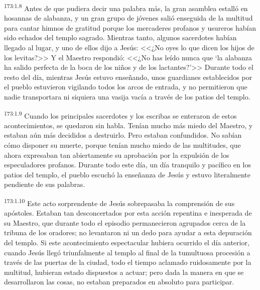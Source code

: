 \par 
\textsuperscript{173:1.8} Antes de que pudiera decir una palabra más, la gran asamblea estalló en hosannas de alabanza, y un gran grupo de jóvenes salió enseguida de la multitud para cantar himnos de gratitud porque los mercaderes profanos y usureros habían sido echados del templo sagrado. Mientras tanto, algunos sacerdotes habían llegado al lugar, y uno de ellos dijo a Jesús: <<¿No oyes lo que dicen los hijos de los levitas?>> Y el Maestro respondió: <<¿No has leído nunca que `la alabanza ha salido perfecta de la boca de los niños y de los lactantes?'>> Durante todo el resto del día, mientras Jesús estuvo enseñando, unos guardianes establecidos por el pueblo estuvieron vigilando todos los arcos de entrada, y no permitieron que nadie transportara ni siquiera una vasija vacía a través de los patios del templo.

\par 
\textsuperscript{173:1.9} Cuando los principales sacerdotes y los escribas se enteraron de estos acontecimientos, se quedaron sin habla. Tenían mucho más miedo del Maestro, y estaban aún más decididos a destruirlo. Pero estaban confundidos. No sabían cómo disponer su muerte, porque tenían mucho miedo de las multitudes, que ahora expresaban tan abiertamente su aprobación por la expulsión de los especuladores profanos. Durante todo este día, un día tranquilo y pacífico en los patios del templo, el pueblo escuchó la enseñanza de Jesús y estuvo literalmente pendiente de sus palabras.

\par 
\textsuperscript{173:1.10} Este acto sorprendente de Jesús sobrepasaba la comprensión de sus apóstoles. Estaban tan desconcertados por esta acción repentina e inesperada de su Maestro, que durante todo el episodio permanecieron agrupados cerca de la tribuna de los oradores; no levantaron ni un dedo para ayudar a esta depuración del templo. Si este acontecimiento espectacular hubiera ocurrido el día anterior, cuando Jesús llegó triunfalmente al templo al final de la tumultuosa procesión a través de las puertas de la ciudad, todo el tiempo aclamado ruidosamente por la multitud, hubieran estado dispuestos a actuar; pero dada la manera en que se desarrollaron las cosas, no estaban preparados en absoluto para participar.

